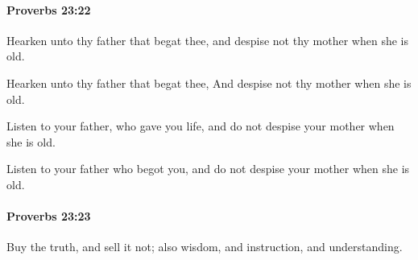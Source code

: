 		\paragraph{Proverbs 23:22} %
			\label{PROVERBS-23-22}

			Hearken unto thy father that begat thee, and despise not thy mother when she is old.

			\begin{versebox}
					\item[BHS] 
					\item[ASV] Hearken unto thy father that begat thee, And despise not thy mother when she is old.
					\item[NIV] Listen to your father, who gave you life, and do not despise your mother when she is old.
					\item[NRSV] Listen to your father who begot you, and do not despise your mother when she is old.
			\end{versebox}

		\paragraph{Proverbs 23:23} %
			\label{PROVERBS-23-23}

			Buy the truth, and sell it not; also wisdom, and instruction, and understanding.


